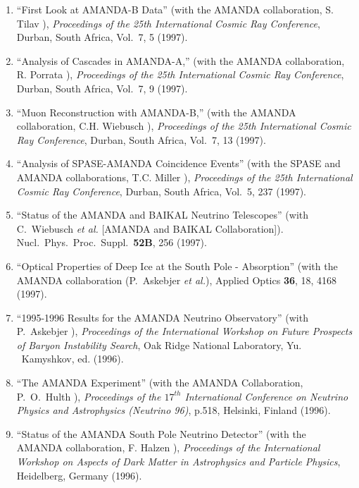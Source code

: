 \begin{enumerate}
\item ``First Look at AMANDA-B Data'' (with the AMANDA
        collaboration,   S. Tilav \etal), {\it Proceedings
        of the 25th International Cosmic     Ray
        Conference}, Durban, South Africa, Vol.~7, 5 (1997).

\item ``Analysis of Cascades in AMANDA-A,'' (with the AMANDA
        collaboration, R. Porrata \etal), {\it Proceedings
        of the 25th     International Cosmic Ray
        Conference}, Durban, South Africa,   Vol.~7, 9
        (1997).

\item ``Muon Reconstruction with AMANDA-B,'' (with the
        AMANDA   collaboration, C.H. Wiebusch \etal), {\it
        Proceedings of the 25th     International Cosmic Ray
        Conference}, Durban, South Africa,   Vol.~7, 13
        (1997).

\item ``Analysis of SPASE-AMANDA Coincidence Events'' (with
        the SPASE and   AMANDA collaborations, T.C. Miller
        \etal), {\it Proceedings of the     25th
        International Cosmic Ray Conference}, Durban, South
        Africa,   Vol.~5, 237 (1997).

\item ``Status of the AMANDA and BAIKAL Neutrino
        Telescopes'' (with C.~Wiebusch {\it et al.}  [AMANDA
        and BAIKAL Collaboration]). Nucl.\ Phys.\ Proc.\
        Suppl.\  {\bf 52B}, 256 (1997).

\item ``Optical Properties of Deep Ice at the South Pole -
        Absorption'' (with the AMANDA collaboration
        (P.~Askebjer {\sl et     al.}), Applied Optics {\bf
        36}, 18, 4168 (1997).

\item ``1995-1996 Results for the AMANDA Neutrino
        Observatory'' (with   P.~Askebjer \etal), {\it
        Proceedings of the International Workshop     on
        Future Prospects of Baryon Instability Search}, Oak
        Ridge   National Laboratory, Yu. ~Kamyshkov, ed.
        (1996).

\item ``The AMANDA Experiment'' (with the AMANDA
        Collaboration,   P.~O.~Hulth \etal), {\it
        Proceedings of the $17^{th}$ International
        Conference on Neutrino Physics and Astrophysics
        (Neutrino 96)},   p.518, Helsinki, Finland (1996).

\item ``Status of the AMANDA South Pole Neutrino Detector''
        (with the   AMANDA collaboration, F. Halzen \etal),
        {\it Proceedings of the     International Workshop
        on Aspects of Dark Matter in Astrophysics     and
        Particle Physics}, Heidelberg, Germany (1996).


\end{enumerate}
